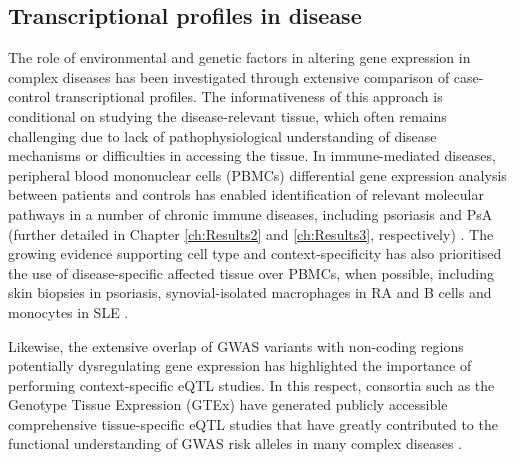 \subsection{Transcriptional profiles in disease}
The role of environmental and genetic factors in altering gene expression in complex diseases has been investigated through extensive comparison of case-control transcriptional profiles. The informativeness of this approach is conditional on studying the disease-relevant tissue, which often remains challenging due to lack of pathophysiological understanding of disease mechanisms or difficulties in accessing the tissue. In immune-mediated diseases, peripheral blood mononuclear cells (PBMCs) differential gene expression analysis between patients and controls has enabled identification of relevant molecular pathways in a number of chronic immune diseases, including psoriasis and PsA (further detailed in Chapter \ref{ch:Results2} and \ref{ch:Results3}, respectively) \parencite{Miao2013,Junta2009,Baechler2003,Assassi2010,Batliwalla2005}.  The growing evidence supporting cell type and context-specificity has also prioritised the use of disease-specific affected tissue over PBMCs, when possible, including skin biopsies in psoriasis, synovial-isolated macrophages in RA and B cells and monocytes in SLE \parencite{Katschke2001,Dozmorov2015,Jabbari2012}. 


Likewise, the extensive overlap of GWAS variants with non-coding regions potentially dysregulating gene expression has highlighted the importance of performing context-specific eQTL studies. In this respect, consortia such as the Genotype Tissue Expression (GTEx) have generated publicly accessible comprehensive tissue-specific eQTL studies that have greatly contributed to the functional understanding of GWAS risk alleles in many complex diseases \parencite{Lonsdale2013,Fagny2017}. %

